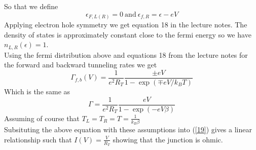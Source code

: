 \documentclass[12pt]{article}
\begin{document}
\begin{enumerate}
    So that we define 
    $$ \epsilon_{F,L(R)} = 0 \ \text{and} \ \epsilon_{f,R} = \epsilon - eV$$ 
    Applying electron hole symmetry we get equation 18 in the lecture notes. The density of states is approximately constant close to the fermi energy so we have $n_{L,R} (\epsilon) = 1$. \\
    Using the fermi distribution above and equations 18 from the lecture notes for the forward and backward tunneling rates we get 
    $$ \Gamma_{f,b} (V) = \frac{1}{e^2 R_T} \frac{\pm eV}{1-\exp (\mp eV / k_B T)} $$
    Which is the same as 
    $$ \Gamma = \frac{1}{e^2 R_T} \frac{ eV}{1-\exp (- eV \beta)} $$
    Assuming of course that $T_L = T_R = T = \frac{1}{k_B \beta}$ \\
    Subsituting the above equation with these assumptions into (\ref{19}) gives a linear relationship such that $I(V) = \frac{V}{R_T} $ showing that the junction is ohmic.






\end{enumerate}
\end{document}
